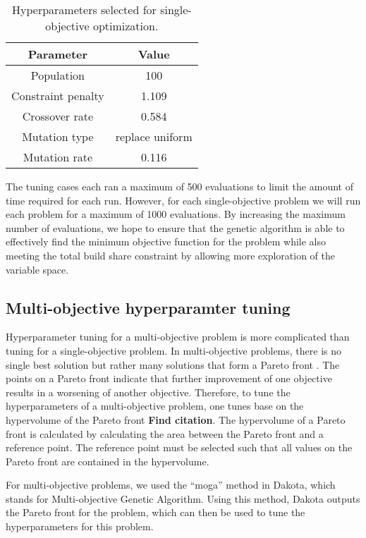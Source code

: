 \begin{table}
    \centering
    \caption{Hyperparameters selected for single-objective optimization.}
    \label{tab:soga_parameters}
    \begin{tabular}{c c}
        \hline
        Parameter & Value \\
        \hline
        Population & 100 \\
        Constraint penalty & 1.109\\
        Crossover rate & 0.584\\
        Mutation type & replace uniform\\
        Mutation rate & 0.116\\
        \hline
    \end{tabular}
\end{table}

The tuning cases each ran a maximum of 500 evaluations to limit the 
amount of time required for each run. However, for each single-objective 
problem we will run each problem for a maximum of 1000 evaluations. By 
increasing the maximum number of evaluations, we hope to ensure that 
the genetic algorithm is able to effectively find the minimum objective 
function for the problem while also meeting the total build share 
constraint by allowing more exploration of the variable space. 

\subsection{Multi-objective hyperparamter tuning}
Hyperparameter tuning for a multi-objective problem is more complicated 
than tuning for a single-objective problem. In multi-objective 
problems, there is no single best solution but rather many solutions 
that form a Pareto front \cite{adams_dakota_2021}. The points on a 
Pareto front indicate that further improvement of one objective 
results in a worsening of another objective. Therefore, to tune the 
hyperparameters of a multi-objective problem, one tunes base on the 
hypervolume of the Pareto front \textbf{Find citation}. The 
hypervolume of a Pareto front is calculated by calculating the area 
between the Pareto front and a reference point. The reference point 
must be selected such that all values on the Pareto front are contained in 
the hypervolume. 

For multi-objective problems, we used the ``moga'' method in Dakota, which 
stands for Multi-objective Genetic Algorithm. Using this method, Dakota
outputs the Pareto front for the problem, which can then be used to 
tune the hyperparameters for this problem. 

